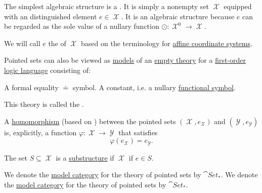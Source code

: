 \begin{definition}\label{def:pointed_set}
  The simplest algebraic structure is a . It is simply a nonempty set \( \mscrX \) equipped with an distinguished element \( e \in \mscrX \). It is an algebraic structure because \( e \) can be regarded as the sole value of a nullary function \( \odot: \mscrX^0 \to \mscrX \).

  We will call \( e \) the  of \( \mscrX \) based on the terminology for \hyperref[def:euclidean_plane_coordinate_system/origin]{affine coordinate systems}.

  \begin{defenum}
     Pointed sets can also be viewed as \hyperref[def:first_order_semantics/satisfiability]{models} of an \hyperref[def:first_order_theory]{empty theory} for a \hyperref[def:first_order_language]{first-order logic language} consisting of:
    \begin{defenum}
       A formal equality \( \doteq \) symbol.
       A constant, i.e. a nullary \hyperref[def:first_order_language/func]{functional symbol}.
    \end{defenum}

    This theory is called the .

     A \hyperref[def:first_order_homomorphism]{homomorphism} (based on ) between the pointed sets \( (\mscrX, e_{\mscrX}) \) and \( (\mscrY, e_{\mscrY}) \) is, explicitly, a function \( \varphi: \mscrX \to \mscrY \) that satisfies
    \begin{equation}\label{eq:def:pointed_set/homomorphism}
      \varphi(e_{\mscrX}) = e_{\mscrY}.
    \end{equation}

     The set \( S \subseteq \mscrX \) is a \hyperref[def:first_order_substructure]{substructure} if \( \mscrX \) if \( e \in S \).

     We denote the \hyperref[def:first_order_model_category]{model category} for the theory of pointed sets by \( \cat{Set}_* \). We denote the \hyperref[def:first_order_model_category]{model category} for the theory of pointed sets by \( \cat{Set}_* \).
  \end{defenum}
\end{definition}
